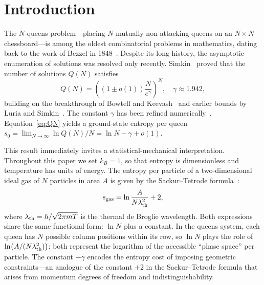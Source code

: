 \documentclass[aps, pre, reprint, amsmath, amssymb, superscriptaddress, floatfix]{revtex4-2}
\begin{document}
\section{Introduction}
\label{sec:intro}

The $N$-queens problem---placing $N$ mutually non-attacking queens on
an $N \times N$ chessboard---is among the oldest combinatorial
problems in mathematics, dating back to the work of Bezzel in
1848~\cite{Bezzel1848}.  Despite its long history, the asymptotic
enumeration of solutions was resolved only recently.  Simkin~\cite{Simkin2022}
proved that the number of solutions $Q(N)$ satisfies
\begin{equation}
  Q(N) = \left((1 \pm o(1))\frac{N}{e^{\gamma}} \right)^N, \quad
  \gamma \approx 1.942,
  \label{eq:QN}
\end{equation}
building on the breakthrough of Bowtell and
Keevash~\cite{Bowtell2023} and earlier bounds by Luria and
Simkin~\cite{Luria2021}.  The constant $\gamma$ has been refined
numerically~\cite{Nobel2023}.  Equation~\eqref{eq:QN} yields a
ground-state entropy per queen
$s_0 = \lim_{N \to \infty} \ln Q(N)/N = \ln N - \gamma + o(1)$.

This result immediately invites a statistical-mechanical
interpretation.  Throughout this paper we set $k_B = 1$, so that
entropy is dimensionless and temperature has units of energy.
The entropy per particle of a two-dimensional ideal gas of $N$
particles in area $A$ is given by the Sackur--Tetrode
formula~\cite{Reif1965}:
\begin{equation}
  s_{\rm gas} = \ln \frac{A}{N \lambda_{\rm th}^2} + 2,
  \label{eq:ST}
\end{equation}
where $\lambda_{\rm th} = h/\sqrt{2\pi m T}$ is the thermal de
Broglie wavelength.  Both expressions share the same functional form:
$\ln N$ plus a constant.  In the queens system, each queen has $N$
possible column positions within its row, so
$\ln N$ plays the role of $\ln\bigl(A/(N\lambda_{\rm th}^2)\bigr)$:
both represent the logarithm of the accessible ``phase space'' per
particle.  The constant $-\gamma$ encodes the entropy cost of
imposing geometric constraints---an analogue of the constant $+2$ in
the Sackur--Tetrode formula that arises from momentum degrees of
freedom and indistinguishability.
\end{document}
